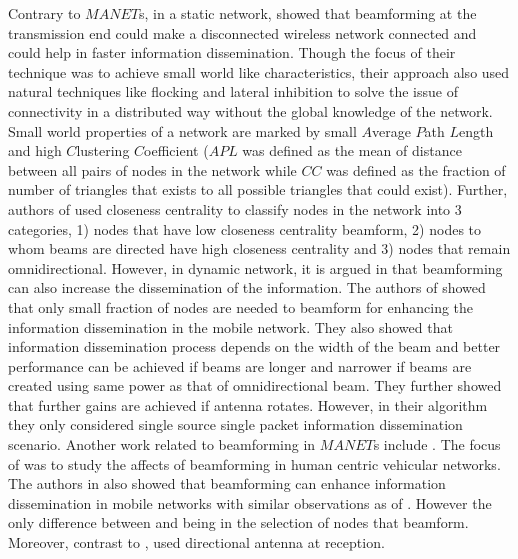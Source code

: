 \documentclass[preprint, twocolumn,5p]{elsarticle}
\begin{document}
Contrary to $MANET$s, in a static network, \cite{Agarwal2011,Agarwal2012} showed that beamforming at the transmission end could make a disconnected wireless network connected and could help in faster information dissemination. Though the focus of their technique was to achieve small world like characteristics, their approach also used natural techniques like flocking and lateral inhibition to solve the issue of connectivity in a distributed way without the global knowledge of the network. Small world properties of a network are marked by small $A$verage $P$ath $L$ength and high $C$lustering $C$oefficient ($APL$ was defined as the mean of distance between all pairs of nodes in the network while $CC$ was defined as the fraction of number of triangles that exists to all possible triangles that could exist). Further, authors of \cite{Agarwal2011,Agarwal2012} used closeness centrality \cite{Freeman1979} to classify nodes in the network into 3 categories, 1) nodes that have low closeness centrality beamform, 2) nodes to whom beams are directed have high closeness centrality and 3) nodes that remain omnidirectional. However, in dynamic network, it is argued in \cite{Peruani2010} that beamforming can also increase the dissemination of the information. The authors of \cite{Peruani2010} showed that only small fraction of nodes are needed to beamform for enhancing the information dissemination in the mobile network. They also showed that information dissemination process depends on the width of the beam and better performance can be achieved if beams are longer and narrower if beams are created using same power as that of omnidirectional beam. They further showed that further gains are achieved if antenna rotates. However, in their algorithm they only considered single source single packet information dissemination scenario. Another work related to beamforming in $MANET$s include \cite{Li2012}. The focus of \cite{Li2012} was to study the affects of beamforming in human centric vehicular networks. The authors in \cite{Li2012} also showed that beamforming can enhance information dissemination in mobile networks with similar observations as of \cite{Peruani2010}. However the only difference between \cite{Peruani2010} and \cite{Li2012} being in the selection of nodes that beamform. Moreover, contrast to \cite{Agarwal2011,Agarwal2012}, \cite{Li2012} used directional antenna at reception.
\end{document}
